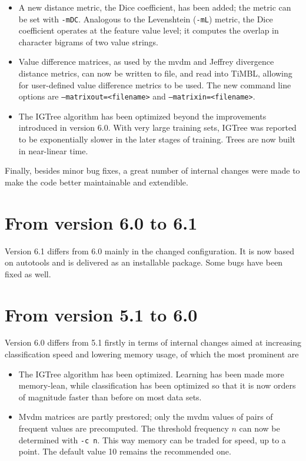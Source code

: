 \documentclass{report}
\begin{document}
\begin{itemize}

\item A new distance metric, the Dice coefficient, has been added; the metric can be set with {\tt -mDC}. Analogous to the Levenshtein ({\tt -mL}) metric, the Dice coefficient operates at the feature value level; it computes the overlap in character bigrams of two value strings.

\item Value difference matrices, as used by the {\sc mvdm} and Jeffrey divergence distance metrics, can now be written to file, and read into TiMBL, allowing for user-defined value difference metrics to be used. The new command line options are {\tt --matrixout=<filename>} and {\tt --matrixin=<filename>}.

\item The {\sc IGTree} algorithm has been optimized beyond the improvements introduced in version 6.0. With very large training sets, {\sc IGTree} was reported to be exponentially slower in the later stages of training. Trees are now built in near-linear time.

\end{itemize}

Finally, besides minor bug fixes, a great number of internal changes were made to make the code better maintainable and extendible.

\section{From version 6.0 to 6.1}

Version 6.1 differs from 6.0 mainly in the changed configuration.  It is now based on autotools and is delivered as an installable package.  Some bugs have been fixed as well.

\section{From version 5.1 to 6.0}

Version 6.0 differs from 5.1 firstly in terms of internal changes aimed at increasing classification speed and lowering memory usage, of which the most prominent are

\begin{itemize}

\item The {\sc IGTree} algorithm has been optimized. Learning has been
  made more memory-lean, while classification has been optimized so
  that it is now orders of magnitude faster than before on most data sets.

\item {\sc Mvdm} matrices are partly prestored; only the {\sc mvdm}
  values of pairs of frequent values are precomputed. The threshold
  frequency $n$ can now be determined with {\tt -c n}. This way memory
  can be traded for speed, up to a point. The default value 10 remains
  the recommended one.

\end{itemize}
\end{document}
